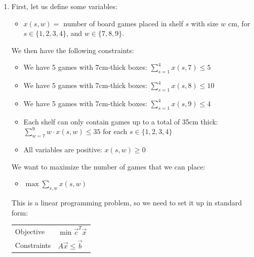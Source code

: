 \begin{enumerate}

\item First, let us define some variables:
	\begin{itemize}
		\item $x(s,w) = $ number of board games placed in shelf $s$ with size $w$ cm, for $s \in \{ 1,2,3,4\}$, and $w \in \{7,8,9\}$.
	\end{itemize}
	
We then have the following constraints:
	\begin{itemize}
		\item We have 5 games with 7cm-thick boxes: $\displaystyle \sum_{s=1}^4 x(s,7) \leq 5$
		\item We have 5 games with 7cm-thick boxes: $\displaystyle \sum_{s=1}^4 x(s,8) \leq 10$
		\item We have 5 games with 7cm-thick boxes: $\displaystyle \sum_{s=1}^4 x(s,9) \leq 4$ \\

		\item Each shelf can only contain games up to a total of 35cm thick: $\displaystyle \sum_{w=7}^9 w \cdot x(s,w) \leq 35$ for each $s \in \{1, 2,3,4\}$
		\item All variables are positive: $x(s,w)\geq 0$
	\end{itemize}
	
We want to maximize the number of games that we can place:
\begin{itemize}
	\item $\displaystyle \max \sum_{s,w} x(s,w)$
\end{itemize}
	
This is a linear programming problem, so we need to set it up in standard form:

\begin{tabular}{ll}
Objective & $\min \vec{c}^T \vec{x}$ \\
Constraints & $A \vec{x} \leq \vec{b}$
\end{tabular}


\end{enumerate}
